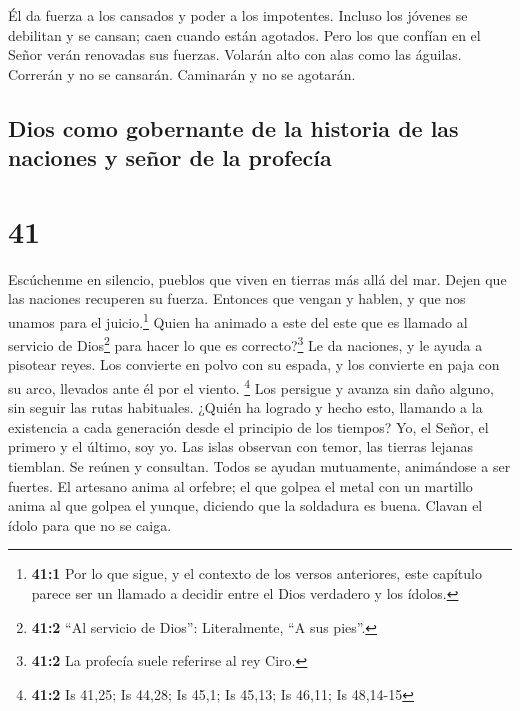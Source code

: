  Él da fuerza a los cansados y poder a los impotentes.
 Incluso los jóvenes se debilitan y se cansan; caen
cuando están agotados.  Pero los que confían en el Señor
verán renovadas sus fuerzas. Volarán alto con alas como las águilas.
Correrán y no se cansarán. Caminarán y no se agotarán.

\hypertarget{dios-como-gobernante-de-la-historia-de-las-naciones-y-seuxf1or-de-la-profecuxeda}{%
\subsection{Dios como gobernante de la historia de las naciones y señor
de la
profecía}\label{dios-como-gobernante-de-la-historia-de-las-naciones-y-seuxf1or-de-la-profecuxeda}}

\hypertarget{section-40}{%
\section{41}\label{section-40}}

 Escúchenme en silencio, pueblos que viven en tierras más
allá del mar. Dejen que las naciones recuperen su fuerza. Entonces que
vengan y hablen, y que nos unamos para el juicio.\footnote{\textbf{41:1}
  Por lo que sigue, y el contexto de los versos anteriores, este
  capítulo parece ser un llamado a decidir entre el Dios verdadero y los
  ídolos.}  Quien ha animado a este del este que es
llamado al servicio de Dios\footnote{\textbf{41:2} ``Al servicio de
  Dios'': Literalmente, ``A sus pies''.} para hacer lo que es
correcto?\footnote{\textbf{41:2} La profecía suele referirse al rey
  Ciro.} Le da naciones, y le ayuda a pisotear reyes. Los convierte en
polvo con su espada, y los convierte en paja con su arco, llevados ante
él por el viento. \footnote{\textbf{41:2} Is 41,25; Is 44,28; Is 45,1;
  Is 45,13; Is 46,11; Is 48,14-15}  Los persigue y avanza
sin daño alguno, sin seguir las rutas habituales.  ¿Quién
ha logrado y hecho esto, llamando a la existencia a cada generación
desde el principio de los tiempos? Yo, el Señor, el primero y el último,
soy yo.  Las islas observan con temor, las tierras lejanas
tiemblan. Se reúnen y consultan.  Todos se ayudan
mutuamente, animándose a ser fuertes.  El artesano anima
al orfebre; el que golpea el metal con un martillo anima al que golpea
el yunque, diciendo que la soldadura es buena. Clavan el ídolo para que
no se caiga.

